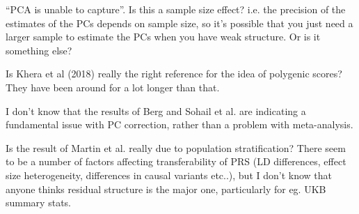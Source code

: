 
\begin{point}{\revref}
 ``PCA is unable to capture''. Is this a sample size effect? i.e. the precision of the estimates of the PCs depends on sample size, so it's possible that you just need a larger sample to estimate the PCs when you have weak structure. Or is it something else?
\end{point}


\begin{point}{\revref}
 Is Khera et al (2018) really the right reference for the idea of polygenic scores? They have been around for a lot longer than that.
\end{point}


\begin{point}{\revref}
 I don't know that the results of Berg and Sohail et al. are indicating a fundamental issue with PC correction, rather than a problem with meta-analysis.
\end{point}


\begin{point}{}
 Is the result of Martin et al. really due to population stratification? There seem to be a number of factors affecting transferability of PRS (LD differences, effect size heterogeneity, differences in causal variants etc..), but I don't know that anyone thinks residual structure is the major one, particularly for eg. UKB summary stats.
\end{point}

